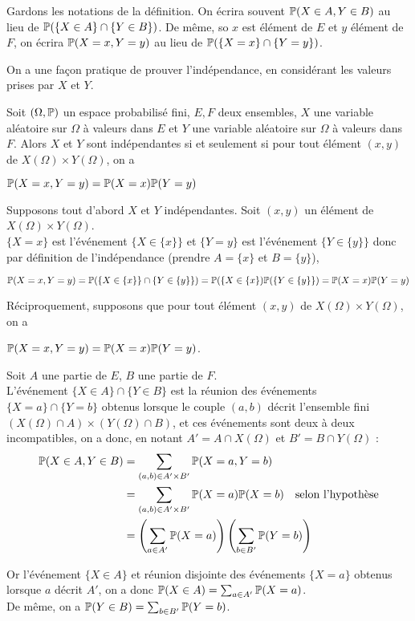 \documentclass[12pt,a4paper]{report}
\begin{document}
\begin{remarque}[Notation]{}
Gardons les notations de la définition. On écrira souvent $\mathbb{P}(X \in A, Y \in B)$ au lieu de $\mathbb{P}(\{X \in A\} \cap \{Y \in B\})$. De même, so $x$ est élément de $E$ et $y$ élément de $F$, on écrira $\mathbb{P}(X=x,Y=y)$ au lieu de $\mathbb{P}(\{X = x\} \cap \{Y = y\})$. \\
\end{remarque}

On a une façon pratique de prouver l'indépendance, en considérant les valeurs prises par $X$ et $Y$.

\begin{proposition}{}{}
Soit $(\Omega,\mathbb{P})$ un espace probabilisé fini, $E,F$ deux ensembles, $X$ une variable aléatoire sur $\Omega$ à valeurs dans $E$ et $Y$ une variable aléatoire sur $\Omega$ à valeurs dans $F$. Alors $X$ et $Y$ sont indépendantes si et seulement si pour tout élément $(x,y)$ de $X(\Omega)\times Y(\Omega)$, on a 
\begin{center}
$\mathbb{P}(X=x,Y=y) = \mathbb{P}(X=x)\mathbb{P}(Y=y)$
\end{center}
\end{proposition}

\begin{demo}{}
Supposons tout d'abord $X$ et $Y$ indépendantes. Soit $(x,y)$ un élément de $X(\Omega) \times Y(\Omega)$. \\
$\{X=x\}$ est l'événement $\{X \in \{x\}\}$ et $\{Y=y\}$ est l'événement $\{Y \in \{y\}\}$ donc par définition de l'indépendance (prendre $A = \{x\}$ et $B = \{y\}$), 
\begin{center}
$\mathbb{P}(X=x,Y=y) = \mathbb{P}(\{X \in \{x\}\} \cap \{Y \in \{y\}\}) = \mathbb{P}(\{X \in \{x\}) \mathbb{P}(\{Y \in \{y\}\}) = \mathbb{P}(X=x)\mathbb{P}(Y=y)$
\end{center}

Réciproquement, supposons que pour tout élément $(x,y)$ de $X(\Omega) \times Y(\Omega)$, on a 
\begin{center}
$\mathbb{P}(X=x,Y=y) = \mathbb{P}(X=x)\mathbb{P}(Y=y)$.
\end{center}

Soit $A$ une partie de $E$, $B$ une partie de $F$. \\
L'événement $\{X \in A\} \cap \{Y \in B\}$ est la réunion des événements $\{X=a\} \cap \{Y = b\}$ obtenus lorsque le couple $(a,b)$ décrit l'ensemble fini $(X(\Omega) \cap A) \times (Y(\Omega) \cap B)$, et ces événements sont deux à deux incompatibles, on a donc, en notant $A' = A \cap X(\Omega)$ et $B' = B \cap Y(\Omega)$ :
\begin{align*}
\mathbb{P}(X \in A, Y \in B) &= \sum_{(a,b) \in A' \times B'} \mathbb{P}(X=a,Y=b) \\
&= \sum_{(a,b) \in A' \times B'} \mathbb{P}(X=a) \mathbb{P}(X=b) \quad \text{selon l'hypothèse} \\
&= \left(\sum_{a \in A'} \mathbb{P}(X=a)\right)\left(\sum_{b \in B'} \mathbb{P}(Y=b)\right)
\end{align*}

Or l'événement $\{X \in A\}$ et réunion disjointe des événements $\{X=a\}$ obtenus lorsque $a$ décrit $A'$, on a donc $\mathbb{P}(X \in A) = \sum_{a \in A'} \mathbb{P}(X=a)$. \\
De même, on a $\mathbb{P}(Y \in B) = \sum_{b \in B'} \mathbb{P}(Y=b)$.

\end{demo}{}
\end{document}
